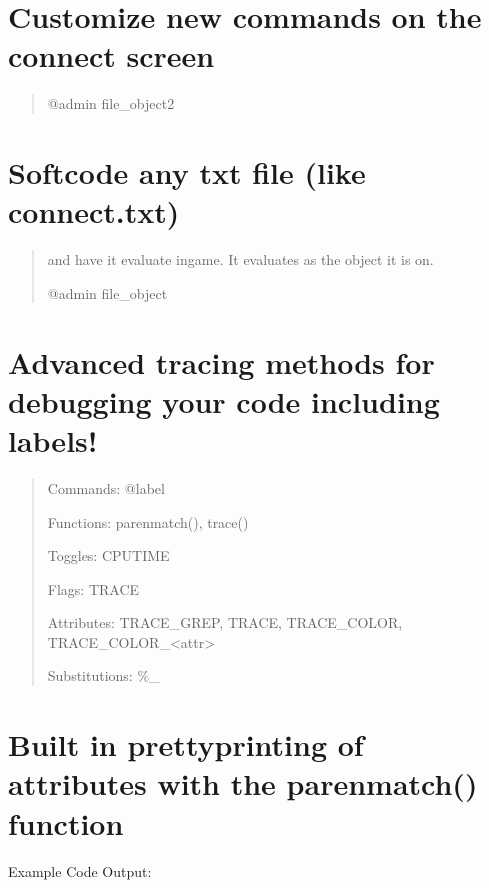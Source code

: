 \documentclass[letterpaper,10pt,english]{sphinxmanual}
\begin{document}
\section{Customize new commands on the connect screen}
\label{\detokenize{features:customize-new-commands-on-the-connect-screen}}\begin{quote}

\sphinxAtStartPar
@admin file\_object2
\end{quote}


\section{Softcode any txt file (like connect.txt)}
\label{\detokenize{features:softcode-any-txt-file-like-connect-txt}}\begin{quote}

\sphinxAtStartPar
and have it evaluate in\sphinxhyphen{}game.  It evaluates as the object it is on.

\sphinxAtStartPar
@admin file\_object
\end{quote}


\section{Advanced tracing methods for debugging your code including labels!}
\label{\detokenize{features:advanced-tracing-methods-for-debugging-your-code-including-labels}}\begin{quote}

\sphinxAtStartPar
Commands: @label

\sphinxAtStartPar
Functions: parenmatch(), trace()

\sphinxAtStartPar
Toggles: CPUTIME

\sphinxAtStartPar
Flags: TRACE

\sphinxAtStartPar
Attributes: TRACE\_GREP, TRACE, TRACE\_COLOR, TRACE\_COLOR\_\textless{}attr\textgreater{}

\sphinxAtStartPar
Substitutions: \%\_
\end{quote}


\section{Built in pretty\sphinxhyphen{}printing of attributes with the parenmatch() function}
\label{\detokenize{features:built-in-pretty-printing-of-attributes-with-the-parenmatch-function}}
\sphinxAtStartPar
Example Code Output:
\end{document}
